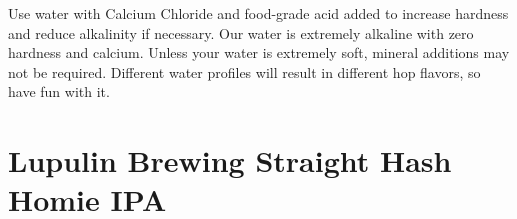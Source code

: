\documentclass[10pt,oneside]{scrbook}
\begin{document}
\begin{methodandtiming}
 
\begin{mashsteps}
\end{mashsteps}

\begin{fermentationsteps}
\end{fermentationsteps}

\begin{directions}
Use water with Calcium Chloride and food-grade acid added to increase hardness and reduce alkalinity
if necessary. Our water is extremely alkaline with zero hardness and calcium. Unless your water is
extremely soft, mineral additions may not be required. Different water profiles will result in
different hop flavors, so have fun with it.
\end{directions}

\end{methodandtiming}

\pagebreak

\begin{ingredientsblock}

\begin{malts}
\end{malts}

\begin{hops}
\end{hops}

\begin{yeasts}
\end{yeasts}

\end{ingredientsblock}

\chapter*{Lupulin Brewing Straight Hash Homie IPA}
\end{document}
